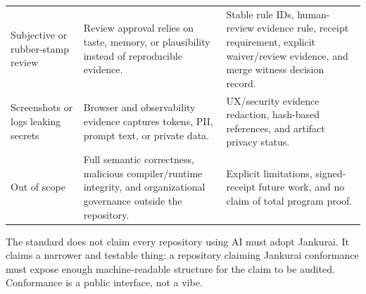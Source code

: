 \begin{table}[t]
\begin{tabularx}{\textwidth}{L{0.18\textwidth} Y Y}
Subjective or rubber-stamp review & Review approval relies on taste, memory, or plausibility instead of reproducible evidence. & Stable rule IDs, human-review evidence rule, receipt requirement, explicit waiver/review evidence, and merge witness decision record. \\
Screenshots or logs leaking secrets & Browser and observability evidence captures tokens, PII, prompt text, or private data. & UX/security evidence redaction, hash-based references, and artifact privacy status. \\
Out of scope & Full semantic correctness, malicious compiler/runtime integrity, and organizational governance outside the repository. & Explicit limitations, signed-receipt future work, and no claim of total program proof. \\
\bottomrule
\end{tabularx}
\end{table}

The standard does not claim every repository using AI must adopt Jankurai. It claims a narrower and testable thing: a repository claiming Jankurai conformance must expose enough machine-readable structure for the claim to be audited. Conformance is a public interface, not a vibe.
